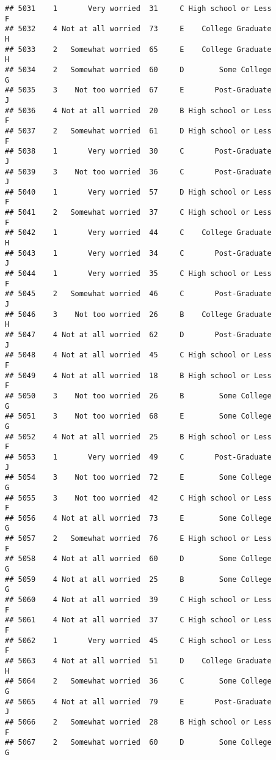 \documentclass[
]{article}
\begin{document}
\begin{verbatim}
## 5031    1       Very worried  31     C High school or Less         F
## 5032    4 Not at all worried  73     E    College Graduate         H
## 5033    2   Somewhat worried  65     E    College Graduate         H
## 5034    2   Somewhat worried  60     D        Some College         G
## 5035    3    Not too worried  67     E       Post-Graduate         J
## 5036    4 Not at all worried  20     B High school or Less         F
## 5037    2   Somewhat worried  61     D High school or Less         F
## 5038    1       Very worried  30     C       Post-Graduate         J
## 5039    3    Not too worried  36     C       Post-Graduate         J
## 5040    1       Very worried  57     D High school or Less         F
## 5041    2   Somewhat worried  37     C High school or Less         F
## 5042    1       Very worried  44     C    College Graduate         H
## 5043    1       Very worried  34     C       Post-Graduate         J
## 5044    1       Very worried  35     C High school or Less         F
## 5045    2   Somewhat worried  46     C       Post-Graduate         J
## 5046    3    Not too worried  26     B    College Graduate         H
## 5047    4 Not at all worried  62     D       Post-Graduate         J
## 5048    4 Not at all worried  45     C High school or Less         F
## 5049    4 Not at all worried  18     B High school or Less         F
## 5050    3    Not too worried  26     B        Some College         G
## 5051    3    Not too worried  68     E        Some College         G
## 5052    4 Not at all worried  25     B High school or Less         F
## 5053    1       Very worried  49     C       Post-Graduate         J
## 5054    3    Not too worried  72     E        Some College         G
## 5055    3    Not too worried  42     C High school or Less         F
## 5056    4 Not at all worried  73     E        Some College         G
## 5057    2   Somewhat worried  76     E High school or Less         F
## 5058    4 Not at all worried  60     D        Some College         G
## 5059    4 Not at all worried  25     B        Some College         G
## 5060    4 Not at all worried  39     C High school or Less         F
## 5061    4 Not at all worried  37     C High school or Less         F
## 5062    1       Very worried  45     C High school or Less         F
## 5063    4 Not at all worried  51     D    College Graduate         H
## 5064    2   Somewhat worried  36     C        Some College         G
## 5065    4 Not at all worried  79     E       Post-Graduate         J
## 5066    2   Somewhat worried  28     B High school or Less         F
## 5067    2   Somewhat worried  60     D        Some College         G

\end{verbatim}
\end{document}
